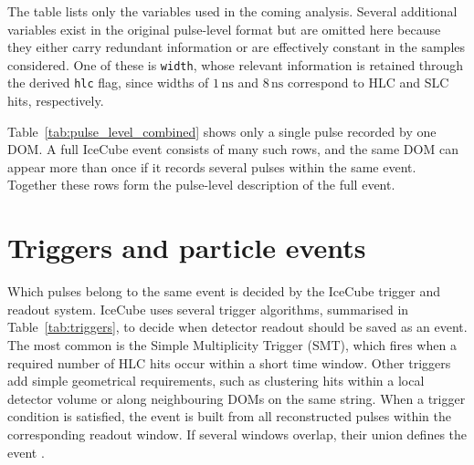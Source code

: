 The table lists only the variables used in the coming analysis. Several additional variables exist in the original pulse-level format but are omitted here because they either carry redundant information or are effectively constant in the samples considered. One of these is \texttt{width}, whose relevant information is retained through the derived \texttt{hlc} flag, since widths of $1\,\mathrm{ns}$ and $8\,\mathrm{ns}$ correspond to HLC and SLC hits, respectively.

Table~\ref{tab:pulse_level_combined} shows only a single pulse recorded by one DOM. A full IceCube event consists of many such rows, and the same DOM can appear more than once if it records several pulses within the same event. Together these rows form the pulse-level description of the full event.

\section{Triggers and particle events}
Which pulses belong to the same event is decided by the IceCube trigger and readout system. IceCube uses several trigger algorithms, summarised in Table~\ref{tab:triggers}, to decide when detector readout should be saved as an event. The most common is the Simple Multiplicity Trigger (SMT), which fires when a required number of HLC hits occur within a short time window. Other triggers add simple geometrical requirements, such as clustering hits within a local detector volume or along neighbouring DOMs on the same string. When a trigger condition is satisfied, the event is built from all reconstructed pulses within the corresponding readout window. If several windows overlap, their union defines the event \cite{IceCube2017}.
\begin{table}[H]
\centering
{}
\caption{Trigger parameters (as of May 2016) and typical trigger rates of each algorithm. Most rates vary seasonally with the atmospheric muon flux. Table and caption text adapted from \cite{IceCube2017}.}
\label{tab:triggers}
\end{table}


